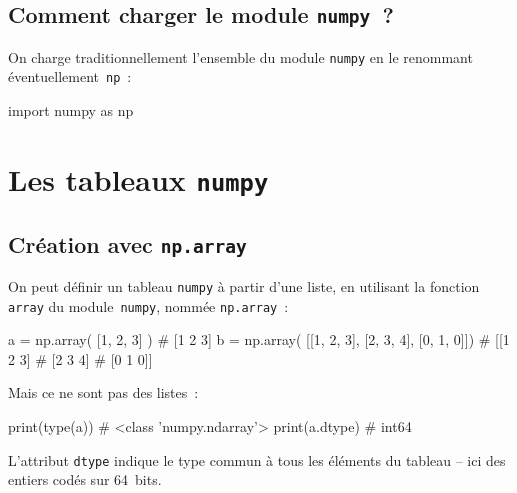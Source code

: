 \documentclass[10pt,fleqn]{article} %
\begin{document}

\subsection{Comment charger le module \texttt{numpy}~?}

On charge traditionnellement l'ensemble du module \texttt{numpy} en le
renommant éventuellement~\texttt{np}~: 

\begin{python}
import numpy as np
\end{python}




\section{Les tableaux \texttt{numpy}}

\subsection{Création avec \texttt{np.array}}
\begin{multicols}{2}
On peut définir un tableau \texttt{numpy} à partir d'une liste, en
utilisant la fonction \texttt{array} du module~\texttt{numpy}, nommée \texttt{np.array}~: 
\begin{python}
a = np.array( [1, 2, 3] )
# [1 2 3]
b = np.array( [[1, 2, 3],
                [2, 3, 4],
                [0, 1, 0]])
# [[1 2 3]
#  [2 3 4]
#  [0 1 0]]  
\end{python}
\vspace{2cm}

Mais ce ne sont pas des listes~:
\begin{python}
print(type(a))
# <class 'numpy.ndarray'>
print(a.dtype)
# int64  
\end{python}
L'attribut \texttt{dtype} indique le type commun à tous les éléments
du tableau -- ici des entiers codés sur 64~bits.

\end{multicols}
\end{document}
